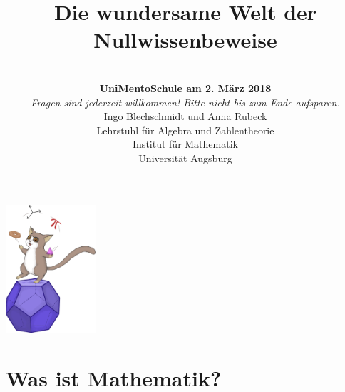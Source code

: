 \documentclass[12pt,compress,ngerman,utf8,t]{beamer}
\title[Nullwissenbeweise]{Die wundersame Welt der \\ Nullwissenbeweise}
\author[Ingo Blechschmidt, Anna Rubeck]{\scriptsize
\vspace*{-1em} \\
\textbf{UniMentoSchule am 2. März 2018} \\
\emph{Fragen sind jederzeit willkommen! Bitte nicht bis zum Ende aufsparen.} \\
\medskip
Ingo Blechschmidt und Anna Rubeck \\
Lehrstuhl für Algebra und Zahlentheorie \\
Institut für Mathematik \\
Universität Augsburg}
\begin{document}
{
\begin{frame}
  \centering
  {\qquad\quad\!}\includegraphics[width=0.25\textwidth]{gregor}
  \vspace*{-0.5em}

  \titlepage
\end{frame}}

\addtocounter{framenumber}{-2}


\section{Was ist Mathematik?}
\end{document}
